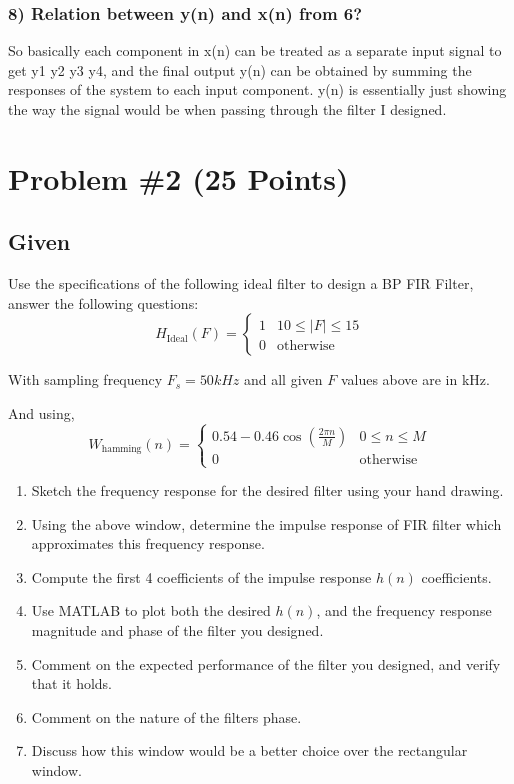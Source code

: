 \documentclass[12pt,letterpaper]{article}
\begin{document}
\subsubsection*{8) Relation between y(n) and x(n) from 6?}
So basically each component in x(n) can be treated as a separate input signal to get y1 y2 y3 y4, and the final output y(n) can be obtained by summing the responses of the system to each input component. y(n) is essentially just showing the way the signal would be when passing through the filter I designed. 


\newpage
\section*{Problem \#2 (25 Points)}
\hrulefill
\subsection*{Given}
Use the specifications of the following ideal filter to design a BP FIR Filter, answer the following questions:
\[
H_{\text{Ideal}}(F) = 
\begin{cases} 
1 & 10 \leq |F| \leq 15 \\
0 & \text{otherwise}
\end{cases}
\]

With sampling frequency \( F_s = 50kHz \) and all given \( F \) values above are in kHz.

And using,
\[
W_{\text{hamming}}(n) = 
\begin{cases} 
0.54 - 0.46 \cos\left(\frac{2\pi n}{M}\right) & 0 \leq n \leq M \\
0 & \text{otherwise}
\end{cases}
\]

\begin{enumerate}
    \item Sketch the frequency response for the desired filter using your hand drawing.
    \item Using the above window, determine the impulse response of FIR filter which approximates this frequency response.
    \item Compute the first 4 coefficients of the impulse response \( h(n) \) coefficients.
    \item Use MATLAB to plot both the desired \( h(n) \), and the frequency response magnitude and phase of the filter you designed.
    \item Comment on the expected performance of the filter you designed, and verify that it holds.
    \item Comment on the nature of the filters phase.
    \item Discuss how this window would be a better choice over the rectangular window.
\end{enumerate}
\newpage
\end{document}
